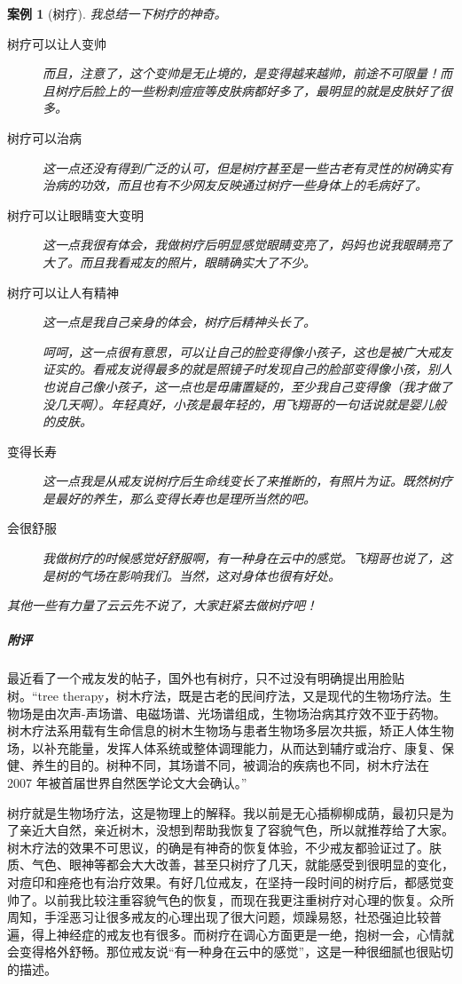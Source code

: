 \documentclass{ctexart}
\newtheorem{case}{案例}
\begin{document}
\begin{case}[树疗]
    我总结一下树疗的神奇。\begin{description}
        \item[树疗可以让人变帅] 而且，注意了，这个变帅是无止境的，是变得越来越帅，前途不可限量！而且树疗后脸上的一些粉刺痘痘等皮肤病都好多了，最明显的就是皮肤好了很多。
        \item[树疗可以治病] 这一点还没有得到广泛的认可，但是树疗甚至是一些古老有灵性的树确实有治病的功效，而且也有不少网友反映通过树疗一些身体上的毛病好了。
        \item[树疗可以让眼睛变大变明] 这一点我很有体会，我做树疗后明显感觉眼睛变亮了，妈妈也说我眼睛亮了大了。而且我看戒友的照片，眼睛确实大了不少。
        \item[树疗可以让人有精神] 这一点是我自己亲身的体会，树疗后精神头长了。
        \item[] 呵呵，这一点很有意思，可以让自己的脸变得像小孩子，这也是被广大戒友证实的。看戒友说得最多的就是照镜子时发现自己的脸部变得像小孩，别人也说自己像小孩子，这一点也是毋庸置疑的，至少我自己变得像（我才做了没几天啊）。年轻真好，小孩是最年轻的，用飞翔哥的一句话说就是婴儿般的皮肤。
        \item[变得长寿] 这一点我是从戒友说树疗后生命线变长了来推断的，有照片为证。既然树疗是最好的养生，那么变得长寿也是理所当然的吧。
        \item[会很舒服] 我做树疗的时候感觉好舒服啊，有一种身在云中的感觉。飞翔哥也说了，这是树的气场在影响我们。当然，这对身体也很有好处。
    \end{description} 其他一些有力量了云云先不说了，大家赶紧去做树疗吧！
\end{case}

\subparagraph{附评} 最近看了一个戒友发的帖子，国外也有树疗，只不过没有明确提出用脸贴树。“tree therapy，树木疗法，既是古老的民间疗法，又是现代的生物场疗法。生物场是由次声-声场谱、电磁场谱、光场谱组成，生物场治病其疗效不亚于药物。树木疗法系用载有生命信息的树木生物场与患者生物场多层次共振，矫正人体生物场，以补充能量，发挥人体系统或整体调理能力，从而达到辅疗或治疗、康复、保健、养生的目的。树种不同，其场谱不同，被调治的疾病也不同，树木疗法在 2007 年被首届世界自然医学论文大会确认。”

树疗就是生物场疗法，这是物理上的解释。我以前是无心插柳柳成荫，最初只是为了亲近大自然，亲近树木，没想到帮助我恢复了容貌气色，所以就推荐给了大家。树木疗法的效果不可思议，的确是有神奇的恢复体验，不少戒友都验证过了。肤质、气色、眼神等都会大大改善，甚至只树疗了几天，就能感受到很明显的变化，对痘印和痤疮也有治疗效果。有好几位戒友，在坚持一段时间的树疗后，都感觉变帅了。以前我比较注重容貌气色的恢复，而现在我更注重树疗对心理的恢复。众所周知，手淫恶习让很多戒友的心理出现了很大问题，烦躁易怒，社恐强迫比较普遍，得上神经症的戒友也有很多。而树疗在调心方面更是一绝，抱树一会，心情就会变得格外舒畅。那位戒友说“有一种身在云中的感觉”，这是一种很细腻也很贴切的描述。
\end{document}
